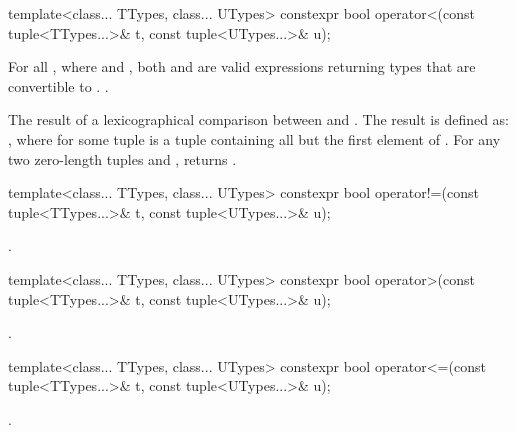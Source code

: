 %
\begin{itemdecl}
template<class... TTypes, class... UTypes>
  constexpr bool operator<(const tuple<TTypes...>& t, const tuple<UTypes...>& u);
\end{itemdecl}

\begin{itemdescr}
\pnum
\requires  For all ,
where  and
, both 
and 
are valid expressions returning types that are
convertible to .
 \tcode{==}
.

\pnum\returns  The result of a lexicographical comparison
between  and . The result is defined
as: , where  for some
tuple  is a tuple containing all but the first element
of .  For any two zero-length tuples 
and ,  returns .
\end{itemdescr}

%
\begin{itemdecl}
template<class... TTypes, class... UTypes>
  constexpr bool operator!=(const tuple<TTypes...>& t, const tuple<UTypes...>& u);
\end{itemdecl}
\begin{itemdescr}
\pnum\returns {}.
\end{itemdescr}

%
\begin{itemdecl}
template<class... TTypes, class... UTypes>
  constexpr bool operator>(const tuple<TTypes...>& t, const tuple<UTypes...>& u);
\end{itemdecl}
\begin{itemdescr}
\pnum\returns {}.
\end{itemdescr}

%
\begin{itemdecl}
template<class... TTypes, class... UTypes>
  constexpr bool operator<=(const tuple<TTypes...>& t, const tuple<UTypes...>& u);
\end{itemdecl}
\begin{itemdescr}
\pnum\returns {}.
\end{itemdescr}


